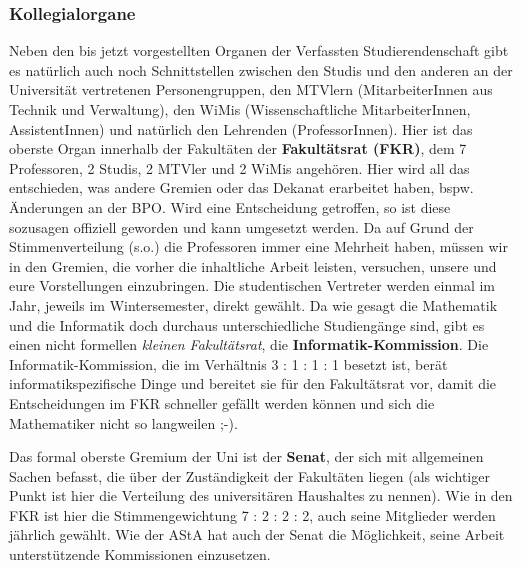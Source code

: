 	\subsubsection*{Kollegialorgane}
		Neben den bis jetzt vorgestellten Organen der Verfassten Studierendenschaft gibt es natürlich auch noch Schnittstellen zwischen den Studis und den anderen an der Universität vertretenen Personengruppen, den MTVlern (MitarbeiterInnen aus Technik und Verwaltung), den WiMis (Wissenschaftliche MitarbeiterInnen, AssistentInnen) und natürlich den Lehrenden (ProfessorInnen). Hier ist das oberste Organ innerhalb der Fakultäten der \textbf{Fakultätsrat (FKR)}, dem 7 Professoren, 2 Studis, 2 MTVler und 2 WiMis angehören. Hier wird all das entschieden, was andere Gremien oder das Dekanat erarbeitet haben, bspw. Änderungen an der BPO. Wird eine Entscheidung getroffen, so ist diese sozusagen offiziell geworden und kann umgesetzt werden. Da auf Grund der Stimmenverteilung (s.o.) die Professoren immer eine Mehrheit haben, müssen wir in den Gremien, die vorher die inhaltliche Arbeit leisten, versuchen, unsere und eure Vorstellungen einzubringen. Die studentischen Vertreter werden einmal im Jahr, jeweils im Wintersemester, direkt gewählt. Da wie gesagt die Mathematik und die Informatik doch durchaus unterschiedliche Studiengänge sind, gibt es einen nicht formellen \emph{kleinen Fakultätsrat}, die \textbf{Informatik-Kommission}. Die Informatik-Kommission, die im Verhältnis 3 : 1 : 1 : 1 besetzt ist, berät informatikspezifische Dinge und bereitet sie für den Fakultätsrat vor, damit die Entscheidungen im FKR schneller gefällt werden können und sich die Mathematiker nicht so langweilen ;-).

		Das formal oberste Gremium der Uni ist der \textbf{Senat}, der sich mit allgemeinen Sachen befasst, die über der Zuständigkeit der Fakultäten liegen (als wichtiger Punkt ist hier die Verteilung des universitären Haushaltes zu nennen). Wie in den FKR ist hier die Stimmengewichtung 7 : 2 : 2 : 2, auch seine Mitglieder werden jährlich gewählt. Wie der AStA hat auch der Senat die Möglichkeit, seine Arbeit unterstützende Kommissionen einzusetzen.

